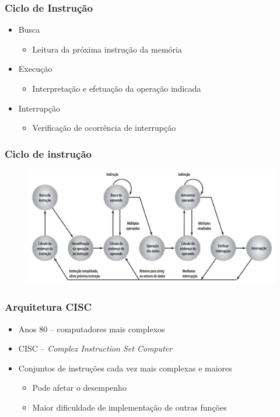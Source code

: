 \documentclass[aspectratio=169,
				xcolor=table]{beamer}
\begin{document}
	
	\begin{frame}
		\frametitle{Ciclo de Instrução}
		\begin{itemize}
			\item Busca
			\begin{itemize}
				\item Leitura da próxima instrução da memória
			\end{itemize}
			\vspace{1em}
			\item Execução
			\begin{itemize}
				\item Interpretação e efetuação da operação indicada
			\end{itemize}
			\vspace{1em}
			\item Interrupção
			\begin{itemize}
				\item Verificação de ocorrência de interrupção
			\end{itemize}
		\end{itemize}
	\end{frame}
	
	\begin{frame}
		\frametitle{Ciclo de instrução}
		\begin{figure}
			\centering
			\includegraphics[height=0.8\textheight , keepaspectratio]{../figs/cap05/intrucao.png} 
		\end{figure}
	\end{frame}
	
	\begin{frame}
		\frametitle{Arquitetura CISC}
		\begin{itemize}
			\item Anos 80 – computadores mais complexos
			\vspace{1em}

			\item CISC – \textit{Complex Instruction Set Computer}
			\vspace{1em}

			\item Conjuntos de instruções cada vez mais complexas e maiores
			\begin{itemize}
				\item Pode afetar o desempenho
				\item Maior dificuldade de implementação de outras funções

			\end{itemize}

		\end{itemize}
	\end{frame}
	
\end{document}
